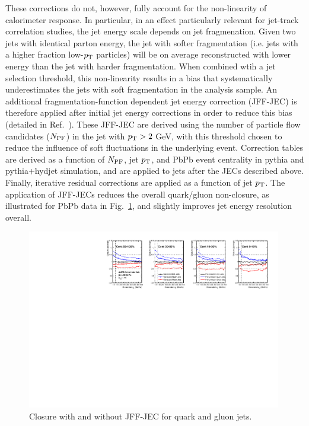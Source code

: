 These corrections do not, however, fully account for the non-linearity of calorimeter response.  In particular, in an effect particularly relevant for jet-track correlation studies, the jet energy scale depends on jet fragmenation.  Given two jets with identical parton energy, the jet with softer fragmentation (i.e. jets with a higher fraction low-$p_{\rm T}$ particles) will be on average reconstructed with lower energy than the jet with harder fragmentation.  When combined wtih a jet selection threshold, this non-linearity results in a bias that systematically underestimates the jets with soft fragmentation in the analysis sample.  An additional fragmentation-function dependent jet energy correction (JFF-JEC) is therefore applied after initial jet energy corrections in order to reduce this bias (detailed in Ref.~\cite{AN_2014_024}).  These JFF-JEC are derived using the number of particle flow candidates ($N_{\rm PF}$) in the jet with $p_{\rm T} > 2$ GeV, with this threshold chosen to reduce the influence of soft fluctuations in the underlying event.   Correction tables are derived as a function of $N_{\rm PF}$, jet $p_{\rm T}$, and PbPb event centrality in {\sc pythia} and {\sc pythia+hydjet} simulation, and are applied to jets after the JECs described above.  Finally, iterative residual corrections are applied as a function of jet $p_{\rm T}$.  The application of JFF-JECs reduces the overall quark/gluon non-closure, as illustrated for PbPb data in Fig.~\ref{fig:quark_gluon}, and slightly improves jet energy resolution overall.

\begin{figure}[hbtp]
\begin{center}
\includegraphics[width=0.99\textwidth]{figures/Detector/fullClosures_DogaIterative_centDep_correctToJetPt.pdf}
\caption{Closure with and without JFF-JEC for quark and gluon jets.}
\label{fig:quark_gluon}
\end{center}
\end{figure}



